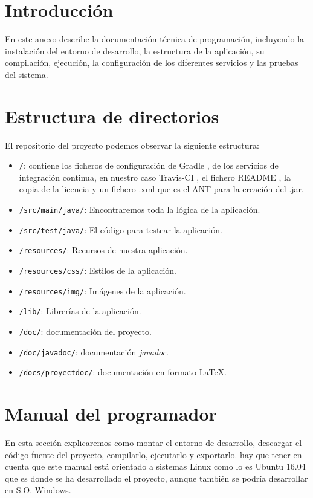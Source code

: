 
\section{Introducción}

En este anexo describe la documentación técnica de programación,
incluyendo la instalación del entorno de desarrollo, la estructura de la
aplicación, su compilación, ejecución, la configuración de los diferentes servicios y las pruebas del sistema.

\section{Estructura de directorios}

El repositorio del proyecto podemos observar la siguiente estructura:

\begin{itemize}
	\tightlist
	\item
	\texttt{/}: contiene los ficheros de configuración de Gradle \cite{gradle}, de los servicios de integración continua, en nuestro caso Travis-CI \cite{web:travis}, el fichero README , la copia de la
	licencia y un fichero .xml que es el ANT para la creación del .jar.
	\item
	\texttt{/src/main/java/}: Encontraremos toda la lógica de la aplicación.
	\item
	\texttt{/src/test/java/}: El código para testear la aplicación.
	\item
	\texttt{/resources/}: Recursos de nuestra aplicación.
	\item
	\texttt{/resources/css/}: Estilos de la aplicación.
	\item
	\texttt{/resources/img/}: Imágenes de la aplicación.
	\item
	\texttt{/lib/}: Librerías de la aplicación.
	\item
	\texttt{/doc/}: documentación del proyecto.
	\item
	\texttt{/doc/javadoc/}: documentación \emph{javadoc}.
	\item
	\texttt{/docs/proyectdoc/}: documentación en formato \LaTeX.
\end{itemize}

\section{Manual del programador}

En esta sección explicaremos como montar el entorno de desarrollo, descargar el código fuente del proyecto, compilarlo, ejecutarlo y exportarlo. hay que tener en cuenta que este manual está orientado a sistemas Linux como lo es Ubuntu 16.04 que es donde se ha desarrollado el proyecto, aunque también se podría desarrollar en S.O. Windows.

